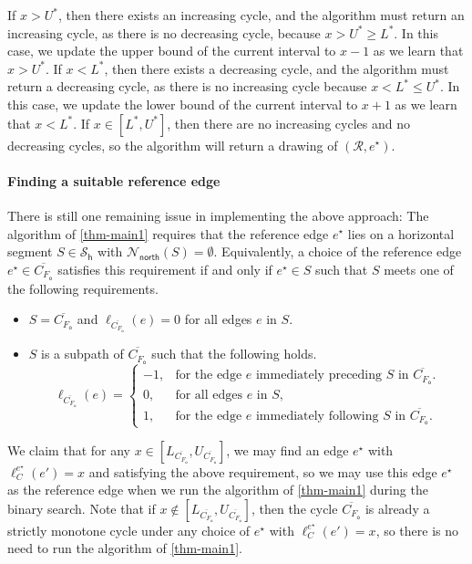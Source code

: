\documentclass{theoretics}
\newcommand{\RR}{\mathcal{R}}
\newcommand{\FO}{F_\mathsf{o}}
\newcommand{\PH}{\mathcal{S}_\mathsf{h}}
\newcommand{\Nnorth}{\mathcal{N}_\mathsf{north}}
\newcommand{\eref}{e^\star}
\begin{document}
If $x > U^\ast$, then there exists an increasing cycle, and the algorithm must return an increasing cycle, as there is no decreasing cycle, because $x > U^\ast \geq L^\ast$. In this case, we update the upper bound of the current interval to $x-1$ as we learn that $x > U^\ast$. If $x <  L^\ast$, then there exists a decreasing cycle, and the algorithm must return a decreasing cycle, as there is no increasing cycle because $x < L^\ast \leq U^\ast$. In this case, we update the lower bound of the current interval to $x+1$ as we learn that $x < L^\ast$. If $x \in [L^\ast, U^\ast]$, then there are no increasing cycles and no decreasing cycles, so the algorithm will return a drawing of $(\RR, \eref)$. 

\paragraph{Finding a suitable reference edge}
There is still one remaining issue in implementing the above approach: The algorithm of \cref{thm-main1} requires that the reference edge $\eref$ lies on a horizontal segment $S \in \PH$ with $\Nnorth(S) = \emptyset$. Equivalently, a choice of the reference edge $\eref \in \overline{C_{\FO}}$ satisfies this requirement if and only if $\eref \in S$ such that $S$ meets  one of the following requirements.
\begin{itemize}
    \item $S = \overline{C_{\FO}}$ and $\ell_{\overline{C_{\FO}}}(e) = 0$ for all edges $e$ in $S$.
    \item $S$ is a subpath of $\overline{C_{\FO}}$ such that the following holds.
    \[
    \ell_{\overline{C_{\FO}}}(e) =\begin{cases}
    -1, & \text{for the edge $e$ immediately preceding $S$ in $\overline{C_{\FO}}$.}\\
    0, & \text{for all edges $e$ in $S$,}\\
    1, & \text{for the edge $e$ immediately following $S$ in $\overline{C_{\FO}}$.}
    \end{cases}
    \]
\end{itemize}

We claim that for any  $x \in  \left[L_{\overline{C_{\FO}}}, U_{\overline{C_{\FO}}}\right]$, we may find an edge $\eref$ with $\ell_C^{\eref}(e') = x$ and satisfying the above requirement, so we may use this edge $\eref$ as the reference edge when we run the algorithm of \cref{thm-main1} during the binary search. Note that if $x \notin \left[L_{\overline{C_{\FO}}}, U_{\overline{C_{\FO}}}\right]$, then the cycle $\overline{C_{\FO}}$ is already a strictly monotone cycle under any choice of $\eref$ with $\ell_C^{\eref}(e') = x$, so there is no need to run the algorithm of \cref{thm-main1}.
\end{document}
